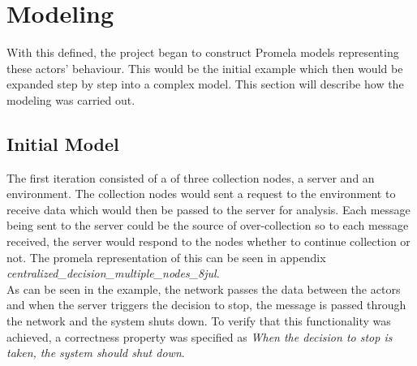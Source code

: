 



\section{Modeling}

With this defined, the project began to construct Promela models representing these actors' behaviour. This would be the initial example which then would be expanded step by step into a complex model. This section will describe how the modeling was carried out.

\subsection{Initial Model}

The first iteration consisted of a \wsn of three collection nodes, a server and an environment. The collection nodes would sent a request to the environment to receive data which would then be passed to the server for analysis. Each message being sent to the server could be the source of over-collection so to each message received, the server would respond to the nodes whether to continue collection or not. The promela representation of this can be seen in appendix \textit{centralized\_decision\_multiple\_nodes\_8jul}. \\

As can be seen in the example, the network passes the data between the actors and when the server triggers the decision to stop, the message is passed through the network and the system shuts down. To verify that this functionality was achieved, a correctness property was specified as \textit{When the decision to stop is taken, the system should shut down}. \\

